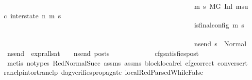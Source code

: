 \begin{isabellebody}
\ \ \ \ \ \ \ \ \ \ \ \ \ \ \ \ \ \ \ \ \ \ \ \ \ \ \ \ \ \ \ \ \ \ \ \ \ \ \ \ \ \ \ \ \ \ \ \ \ \ \ \ \ \ \ \ {\isacharparenleft}{\kern0pt}{\isasymforall}m{\isacharprime}{\kern0pt}\ s{\isacharprime}{\kern0pt}{\isachardot}{\kern0pt}\ {\isacharparenleft}{\kern0pt}{\isacharparenleft}{\kern0pt}M{\isacharcomma}{\kern0pt}{\isasymLambda}{\isacharcomma}{\kern0pt}{\isasymGamma}{\isacharcomma}{\kern0pt}{\isasymOmega}{\isacharcomma}{\kern0pt}G\ {\isasymturnstile}{\isacharparenleft}{\kern0pt}Inl\ {\isacharparenleft}{\kern0pt}msuc{}{\isacharparenright}{\kern0pt}{\isacharcomma}{\kern0pt}\ inter{\isacharunderscore}{\kern0pt}state{\isacharparenright}{\kern0pt}\ {\isacharminus}{\kern0pt}n{\isasymrightarrow}{\isacharasterisk}{\kern0pt}\ {\isacharparenleft}{\kern0pt}m{\isacharprime}{\kern0pt}{\isacharcomma}{\kern0pt}\ s{\isacharprime}{\kern0pt}{\isacharparenright}{\kern0pt}{\isacharparenright}{\kern0pt}\ {\isasymlongrightarrow}\isanewline
\ \ \ \ \ \ \ \ \ \ \ \ \ \ \ \ \ \ \ \ \ \ \ \ \ \ \ \ \ \ \ \ \ \ \ \ \ \ \ \ \ \ \ \ \ \ \ \ \ \ \ \ \ \ \ \ is{\isacharunderscore}{\kern0pt}final{\isacharunderscore}{\kern0pt}config\ {\isacharparenleft}{\kern0pt}m{\isacharprime}{\kern0pt}{\isacharcomma}{\kern0pt}\ s{\isacharprime}{\kern0pt}{\isacharparenright}{\kern0pt}\ {\isasymlongrightarrow}\ \isanewline
\ \ \ \ \ \ \ \ \ \ \ \ \ \ \ \ \ \ \ \ \ \ \ \ \ \ \ \ \ \ \ \ \ \ \ \ \ \ \ \ \ \ \ \ \ \ \ \ \ \ \ \ \ \ \ \ {\isacharparenleft}{\kern0pt}{\isasymforall}ns{\isacharunderscore}{\kern0pt}end{\isachardot}{\kern0pt}\ s{\isacharprime}{\kern0pt}\ {\isacharequal}{\kern0pt}\ Normal\ ns{\isacharunderscore}{\kern0pt}end\ {\isasymlongrightarrow}\ {\isacharparenleft}{\kern0pt}expr{\isacharunderscore}{\kern0pt}all{\isacharunderscore}{\kern0pt}sat\ {\isasymLambda}\ {\isasymGamma}\ {\isasymOmega}\ ns{\isacharunderscore}{\kern0pt}end{\isacharparenright}{\kern0pt}\ posts{\isacharparenright}{\kern0pt}{\isacharparenright}{\kern0pt}{\isacharparenright}{\kern0pt}\ {\isacharparenright}{\kern0pt}{\isachardoublequoteclose}\isanewline
\ \ \ \ \ \ \ \ \ \ \isamarkupfalse%
\ cfg{\isacharunderscore}{\kern0pt}satisfies{\isacharunderscore}{\kern0pt}post\isanewline
\ \ \ \ \ \ \ \ \ \ \isamarkupfalse%
\ {\isacharparenleft}{\kern0pt}metis\ {\isacharparenleft}{\kern0pt}no{\isacharunderscore}{\kern0pt}types{\isacharparenright}{\kern0pt}\ RedNormalSucc\ assms{\isacharparenleft}{\kern0pt}{}{\isacharparenright}{\kern0pt}\ assms{\isacharparenleft}{\kern0pt}{}{\isacharparenright}{\kern0pt}\ block{\isacharunderscore}{\kern0pt}local{\isacharunderscore}{\kern0pt}rel\ cfg{\isacharunderscore}{\kern0pt}correct\ converse{\isacharunderscore}{\kern0pt}rtranclp{\isacharunderscore}{\kern0pt}into{\isacharunderscore}{\kern0pt}rtranclp\ dag{\isacharunderscore}{\kern0pt}verifies{\isacharunderscore}{\kern0pt}propagate{\isacharunderscore}{\kern0pt}{}\ local{\isachardot}{\kern0pt}RedParsedWhileFalse{\isacharparenleft}{\kern0pt}{}{\isacharparenright}{\kern0pt}{\isacharparenright}{\kern0pt}\isanewline

\end{isabellebody}
